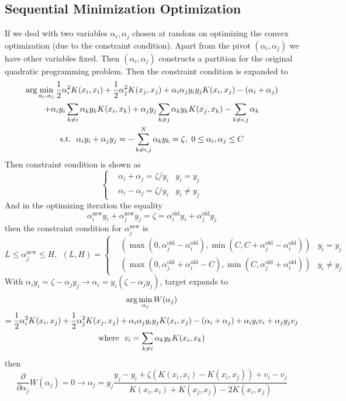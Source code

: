 \documentclass[12pt]{article}
\newcommand{\new}{\text{new}}
\newcommand{\old}{\text{old}}
\begin{document}
\subsection{Sequential Minimization Optimization}
If we deal with two variables $\alpha_i, \alpha_j$ chosen at random on optimizing the convex optimization (due to the constraint condition). Apart from the pivot $(\alpha_i, \alpha_j)$ we have other variables fixed. Then $(\alpha_i, \alpha_j)$ constructs a partition for the original quadratic programming problem.
Then the constraint condition is expanded to
\begin{gather}
    \arg \min_{\alpha_i, \alpha_j} \frac{1}{2} \alpha_i^2 K(x_i, x_i) + \frac{1}{2}\alpha_j^2 K(x_j, x_j) + \alpha_i\alpha_j y_i y_j K(x_i, x_j) - (\alpha_i + \alpha_j) \notag \\ + \alpha_i y_i \sum_{k\neq i} \alpha_k y_k K(x_i, x_k) + \alpha_j y_j \sum_{k\neq j}
    \alpha_k y_k K(x_j, x_k) - \sum_{k\neq i, j} \alpha_k \\
    \text{s.t.}~~\alpha_iy_i + \alpha_jy_j = -\sum_{k \neq i,j}^N \alpha_k y_k =   \zeta,~0 \leq \alpha_i, \alpha_j \leq C
\end{gather}
Then constraint condition is shown as
\begin{equation}
    \left\{ \begin{aligned}
        &\alpha_i + \alpha_j = \zeta / y_i &y_i = y_j \\
        &\alpha_i - \alpha_j = \zeta / y_i &y_i \neq y_j
    \end{aligned} \right.
\end{equation}
And in the optimizing iteration the equality
\begin{equation}
    \alpha_i^{\new}y_i + \alpha_j^{\new}y_j = \zeta = \alpha_i^{\old}y_i + \alpha_j^{\old}y_j
\end{equation}
then the constraint condition for $\alpha_j^{\new}$ is
\begin{equation}
    L \leq \alpha_j^{\new} \leq H,~~(L, H) = \left\{ \begin{aligned}
        &\left( \max(0, \alpha_j^{\old} - \alpha_i^{\old}), \min(C, C+\alpha_j^{\old} - \alpha_i^{\old}) \right) &y_i = y_j \\
        &\left( \max(0, \alpha_j^{\old} + \alpha_i^{\old} - C), \min(C, \alpha_j^{\old} + \alpha_i^{\old})\right) &y_i \neq y_j
    \end{aligned} \right.
\end{equation}
With $\alpha_iy_i = \zeta - \alpha_jy_j \rightarrow \alpha_i = y_i(\zeta - \alpha_jy_j)$, target expands to
\begin{gather}
    \arg \min_{\alpha_j} W(\alpha_j) \notag \\= \frac{1}{2}\alpha_i^2K(x_i, x_j) + \frac{1}{2}\alpha_j^2K(x_j, x_j) + \alpha_i\alpha_jy_iy_jK(x_i, x_j)-(\alpha_i+\alpha_j) + \alpha_iy_iv_i+\alpha_jy_jv_j \\
    \text{where}~~v_i = \sum_{k\neq i} \alpha_k y_k K(x_i, x_k)
\end{gather}
then
\begin{equation}
    \frac{\partial}{\partial \alpha_j}W(\alpha_j) = 0 \rightarrow \alpha_j = y_j \frac{y_j - y_i + \zeta(K(x_i, x_i) - K(x_i, x_j))+v_i - v_j}{K(x_i,x_i) + K(x_j, x_j) - 2K(x_i, x_j)}
\end{equation}
\end{document}
